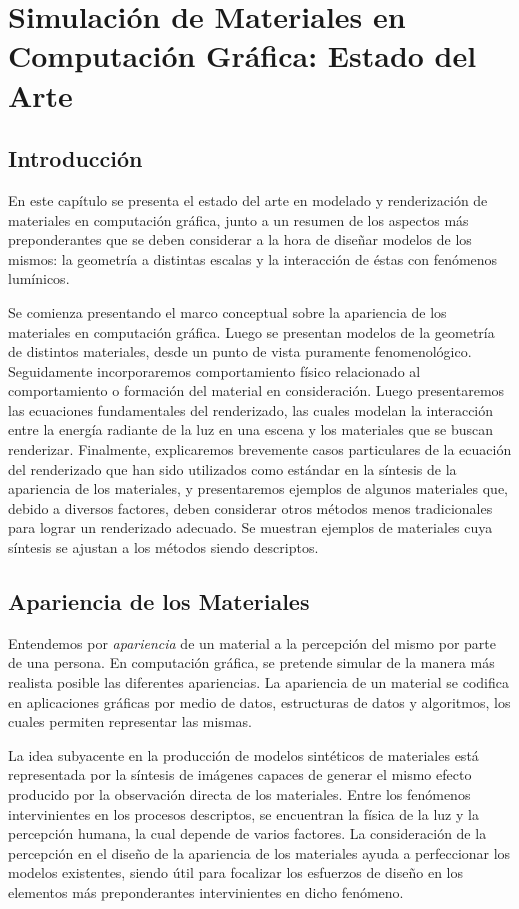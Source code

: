 
\chapter[Estado del Arte]{Simulación de Materiales en Computación Gráfica: Estado del Arte}
\section{Introducción} %

En este capítulo se presenta el estado del arte en modelado y renderización de materiales en computación gráfica, junto a un resumen de los aspectos más preponderantes que se deben considerar a la hora de diseñar modelos de los mismos: la geometría a distintas escalas y la  interacción de éstas con fenómenos lumínicos.

Se comienza presentando el marco conceptual sobre la apariencia de los materiales en computación gráfica.
Luego se presentan modelos de la geometría de distintos materiales, desde un punto de vista puramente fenomenológico.
Seguidamente incorporaremos comportamiento físico relacionado al comportamiento o formación del material en consideración.
Luego presentaremos las ecuaciones fundamentales del renderizado, las cuales modelan la interacción entre la energía radiante de la luz en una escena y los materiales que se buscan renderizar.
Finalmente, explicaremos brevemente casos particulares de la ecuación del renderizado que han sido utilizados como estándar en la síntesis de la apariencia de los materiales, y presentaremos ejemplos de algunos materiales que, debido a diversos factores, deben considerar otros métodos menos tradicionales para lograr un renderizado adecuado.
Se muestran ejemplos de materiales cuya síntesis se ajustan a los métodos 
siendo descriptos.

\section{Apariencia de los Materiales}
Entendemos por {\em apariencia} de un material a la percepción del mismo por parte de una persona.
En computación gráfica, se pretende simular de la manera más realista posible las diferentes apariencias.
La apariencia de un material se codifica en aplicaciones gráficas por medio de datos, estructuras de datos y algoritmos, los cuales permiten representar las mismas.

La idea subyacente en la producción de modelos sintéticos de materiales está representada por la síntesis de imágenes capaces de generar el mismo efecto producido por la observación directa de los materiales.
Entre los fenómenos intervinientes en los procesos descriptos, se encuentran la física de la luz y la percepción humana, la cual depende de varios factores.
La consideración de la percepción en el diseño de la apariencia de los materiales ayuda a perfeccionar los modelos existentes, siendo útil para focalizar los esfuerzos de diseño en los elementos más preponderantes intervinientes en dicho fenómeno.
 


